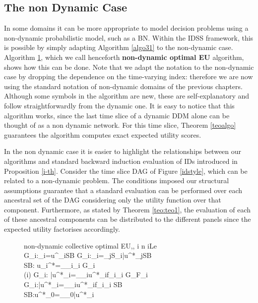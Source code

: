 \subsection{The non Dynamic Case}
\label{sec:nondynalg}
In some domains it can be more appropriate to model decision problems using a non-dynamic probabilistic model, such as a BN. Within the IDSS framework, this is possible by simply adapting Algorithm \ref{algo31} to the non-dynamic case. Algorithm \ref{algo32}, which we  call henceforth \textbf{non-dynamic optimal EU} algorithm, shows how this can be done. Note that we adapt the notation to the non-dynamic case by dropping the dependence on the time-varying index: therefore we are now using the standard notation of non-dynamic domains of the previous chapters. Although some symbols in the algorithm are new, these are self-explanatory and follow straightforwardly from the dynamic one. It is easy to notice that this algorithm works, since the last time slice of a dynamic DDM alone can be thought of as a non dynamic network. For this time slice, Theorem \ref{teoalgo} guarantees the algorithm computes exact expected utility scores. 

In the non dynamic case it is easier to highlight the relationships between our algorithms and standard backward induction evaluation of IDs introduced in Proposition \ref{i-th}. Consider the time slice DAG of Figure \ref{idstyle}, which can be related to a non-dynamic problem. The conditions imposed our structural assumptions guarantee that a standard evaluation can be performed over each ancestral set of the DAG considering only the utility function over that component. Furthermore, as stated by Theorem \ref{teo:teo1}, the evaluation of each of these ancestral components can be distributed to the different panels since the expected utility factorises accordingly.

\begin{figure}
\begin{center}
\begin{pseudocode}[ruled]{non-dynamic collective optimal EU}{,,\Gr}
\label{algo32}
\FOR i \GETS n  \DO \BEGIN
\IF i\in Le\\ \BEGIN  
 G_i:_{i}=u^{\Gr}_i\longrightarrow SB  \END
\ELSE G_i:_{i}=\sum_{j\in S_i}\bar{u}^*_{j}\longrightarrow SB  \\
 SB: u_{i}^*=\max_{_i}_{i} \longrightarrow G_i \\
\IF (i)  \THEN \BEGIN G_i: \bar{u}^*_{i}=\int_{_i}u^*_{i}f_i\dr {}_i \longrightarrow G_{F_i} \END
\ELSE \BEGIN G_i:\bar{u}^*_{i}=\int_{_i}u^*_{i}f_i\dr {}_i \longrightarrow SB \\
SB:u^*_0=\max_{_0}\bar{u}^*_{i}  
\END
\END 
\end{pseudocode}
\end{center}
\end{figure}
